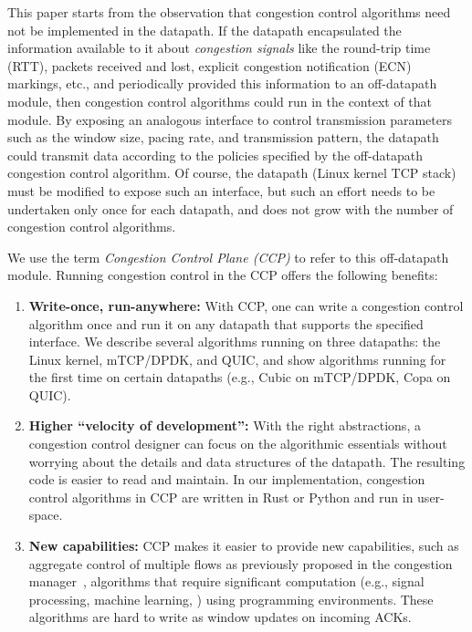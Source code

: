 This paper starts from the observation that congestion control algorithms need not be implemented in the datapath. If the datapath encapsulated the information available to it about {\em congestion signals} like the round-trip time (RTT), packets received and lost, explicit congestion notification (ECN) markings, etc., and periodically provided this information to an off-datapath module, then congestion control algorithms could run in the context of that module. By exposing an analogous interface to control transmission parameters such as the window size, pacing rate, and transmission pattern, the datapath could transmit data according to the policies specified by the off-datapath congestion control algorithm. Of course, the datapath (\eg Linux kernel TCP stack) must be modified to expose
such an interface, but such an effort needs to be undertaken only once for each datapath, and does not grow with the number of congestion control algorithms.

We use the term {\em Congestion Control Plane (CCP)} to refer to this off-datapath module. Running congestion control in the CCP offers the following benefits:
\begin{enumerate}
    \item {\bf Write-once, run-anywhere:} With CCP, one can write a congestion control algorithm once and run it on any datapath that supports the specified interface. 
    We describe several algorithms running on three datapaths: the Linux kernel, mTCP/DPDK, and QUIC, and show algorithms running for the first time on certain datapaths (e.g., Cubic on mTCP/DPDK, Copa on QUIC).
    \item {\bf Higher ``velocity of development'':} With the right abstractions,
      a congestion control designer can focus on the algorithmic essentials
      without worrying about the details and data structures of the
      datapath. The resulting code is easier to read and maintain. In our implementation, congestion control algorithms in CCP are written in Rust or Python and run in user-space. 

    \item {\bf New capabilities:} CCP makes it easier to provide new
      capabilities, such as aggregate control of multiple flows as previously
      proposed in the congestion manager~\cite{cm}, algorithms that require significant computation (e.g., signal processing, machine learning, \etc) using \userspace programming environments. These algorithms are hard to write as window updates on incoming ACKs.
\end{enumerate}

